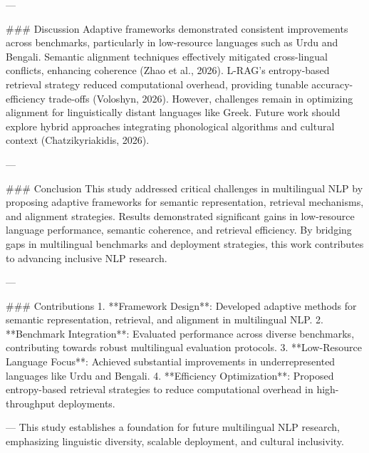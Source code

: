---

### Discussion  
Adaptive frameworks demonstrated consistent improvements across benchmarks, particularly in low-resource languages such as Urdu and Bengali. Semantic alignment techniques effectively mitigated cross-lingual conflicts, enhancing coherence (Zhao et al., 2026). L-RAG's entropy-based retrieval strategy reduced computational overhead, providing tunable accuracy-efficiency trade-offs (Voloshyn, 2026). However, challenges remain in optimizing alignment for linguistically distant languages like Greek. Future work should explore hybrid approaches integrating phonological algorithms and cultural context (Chatzikyriakidis, 2026).

---

### Conclusion  
This study addressed critical challenges in multilingual NLP by proposing adaptive frameworks for semantic representation, retrieval mechanisms, and alignment strategies. Results demonstrated significant gains in low-resource language performance, semantic coherence, and retrieval efficiency. By bridging gaps in multilingual benchmarks and deployment strategies, this work contributes to advancing inclusive NLP research.

---

### Contributions  
1. **Framework Design**: Developed adaptive methods for semantic representation, retrieval, and alignment in multilingual NLP.  
2. **Benchmark Integration**: Evaluated performance across diverse benchmarks, contributing towards robust multilingual evaluation protocols.  
3. **Low-Resource Language Focus**: Achieved substantial improvements in underrepresented languages like Urdu and Bengali.  
4. **Efficiency Optimization**: Proposed entropy-based retrieval strategies to reduce computational overhead in high-throughput deployments.  

---  
This study establishes a foundation for future multilingual NLP research, emphasizing linguistic diversity, scalable deployment, and cultural inclusivity.